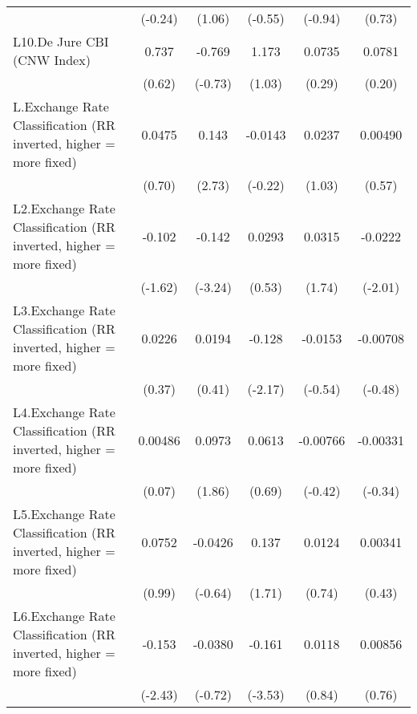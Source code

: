 {\begin{tabular}{l*{5}{c}}
                &  (-0.24)         &   (1.06)         &  (-0.55)         &  (-0.94)         &   (0.73)         \\
[1em]
L10.De Jure CBI (CNW Index)&    0.737         &   -0.769         &    1.173         &   0.0735         &   0.0781         \\
                &   (0.62)         &  (-0.73)         &   (1.03)         &   (0.29)         &   (0.20)         \\
[1em]
L.Exchange Rate Classification (RR inverted, higher = more fixed)&   0.0475         &    0.143\sym{**} &  -0.0143         &   0.0237         &  0.00490         \\
                &   (0.70)         &   (2.73)         &  (-0.22)         &   (1.03)         &   (0.57)         \\
[1em]
L2.Exchange Rate Classification (RR inverted, higher = more fixed)&   -0.102         &   -0.142\sym{**} &   0.0293         &   0.0315         &  -0.0222\sym{*}  \\
                &  (-1.62)         &  (-3.24)         &   (0.53)         &   (1.74)         &  (-2.01)         \\
[1em]
L3.Exchange Rate Classification (RR inverted, higher = more fixed)&   0.0226         &   0.0194         &   -0.128\sym{*}  &  -0.0153         & -0.00708         \\
                &   (0.37)         &   (0.41)         &  (-2.17)         &  (-0.54)         &  (-0.48)         \\
[1em]
L4.Exchange Rate Classification (RR inverted, higher = more fixed)&  0.00486         &   0.0973         &   0.0613         & -0.00766         & -0.00331         \\
                &   (0.07)         &   (1.86)         &   (0.69)         &  (-0.42)         &  (-0.34)         \\
[1em]
L5.Exchange Rate Classification (RR inverted, higher = more fixed)&   0.0752         &  -0.0426         &    0.137         &   0.0124         &  0.00341         \\
                &   (0.99)         &  (-0.64)         &   (1.71)         &   (0.74)         &   (0.43)         \\
[1em]
L6.Exchange Rate Classification (RR inverted, higher = more fixed)&   -0.153\sym{*}  &  -0.0380         &   -0.161\sym{***}&   0.0118         &  0.00856         \\
                &  (-2.43)         &  (-0.72)         &  (-3.53)         &   (0.84)         &   (0.76)         \\

\end{tabular}}
